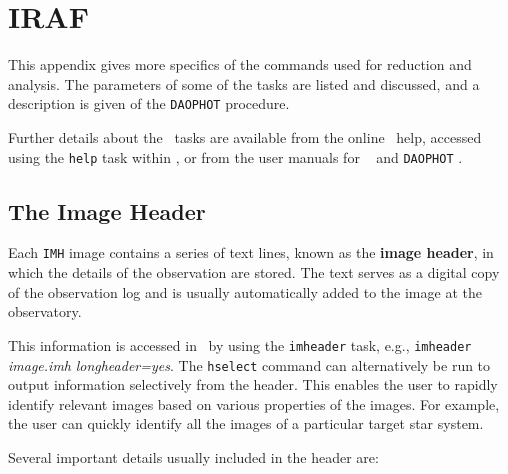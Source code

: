 
\chapter{IRAF}\label{cha:IRAF}

This appendix gives more specifics of the commands used for reduction
and analysis. The parameters of some of the tasks are listed and
discussed, and a description is given of the \texttt{DAOPHOT}
procedure. %

\vspace{\myparskip}

Further details about the \iraf\ tasks are available from the
online \iraf\ help, accessed using the \texttt{help} task
within \iraf, or from the user manuals for \iraf\ %
\cite{Barnes:1993} %
and \texttt{DAOPHOT} %
\cite{Davis:1994}. %


\section{The Image Header}\label{cha:IRAF:sec:Imhead}

Each \texttt{IMH} image contains a series of text lines, known as the
\textbf{image header}, %
in which the details of the observation are stored. The text serves as
a digital copy of the observation log and is usually automatically
added to the image at the observatory. %

\vspace{\myparskip}

This information is accessed in \iraf\ by using the
\texttt{imheader} task, e.g., \texttt{imheader} \textit{image.imh}
\textit{longheader=yes}. The \texttt{hselect} command can
alternatively be run to output information selectively from the
header. This enables the user to rapidly identify relevant images
based on various properties of the images. For example, the user can
quickly identify all the images of a particular target star system. %

\vspace{\myparskip}

Several important details usually included in the header are:


